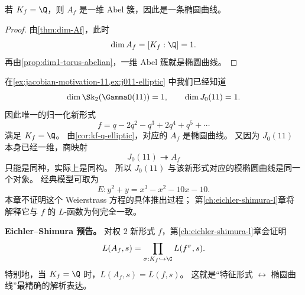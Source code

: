 \begin{corollary}[有理系数情形给出椭圆曲线]
\label{cor:kf-q-elliptic}
若 $K_f=\Q$，则 $A_f$ 是一维 Abel 簇，因此是一条椭圆曲线。
\end{corollary}

\begin{proof}
由\cref{thm:dim-Af}，此时
\[
  \dim A_f=[K_f:\Q]=1.
\]
再由\cref{prop:dim1-torus-abelian}，一维 Abel 簇就是椭圆曲线。
\end{proof}

\begin{example}[级别 $11$ 的模椭圆曲线]
\label{ex:level11-modular-abelian}
在\cref{ex:jacobian-motivation-11,ex:j011-elliptic} 中我们已经知道
\[
  \dim \Sk_2(\GammaO(11))=1,
  \qquad
  \dim J_0(11)=1.
\]
因此唯一的归一化新形式
\[
  f=q-2q^2-q^3+2q^4+q^5+\cdots
\]
满足 $K_f=\Q$。
由\cref{cor:kf-q-elliptic}，对应的 $A_f$ 是椭圆曲线。
又因为 $J_0(11)$ 本身已经一维，商映射
\[
  J_0(11)\twoheadrightarrow A_f
\]
只能是同种，实际上是同构。
所以 $J_0(11)$ 与该新形式对应的模椭圆曲线是同一个对象。
经典模型可取为
\[
  E: y^2+y=x^3-x^2-10x-10.
\]
本章不证明这个 Weierstrass 方程的具体推出过程；
第\ref{ch:eichler-shimura-l}章将解释它与 $f$ 的 $L$-函数为何完全一致。
\end{example}

\textbf{Eichler--Shimura 预告。}
对权 $2$ 新形式 $f$，第\ref{ch:eichler-shimura-l}章会证明
\[
  L(A_f,s)=\prod_{\sigma:K_f\hookrightarrow\C} L(f^\sigma,s).
\]
特别地，当 $K_f=\Q$ 时，$L(A_f,s)=L(f,s)$。
这就是“特征形式 $\leftrightarrow$ 椭圆曲线”最精确的解析表达。
